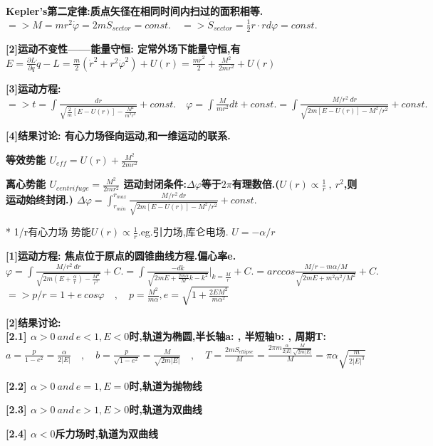 		\bf{Kepler's第二定律}:质点矢径在相同时间内扫过的面积相等.
			$ => M = m r^2 \dot \varphi = 2 m \dot S_{sector} = const.\quad => \dot S_{sector} = \frac{1}{2} r \cdot r d\varphi = const.$
	
		\bf{[2]运动不变性——能量守恒}: 定常外场下能量守恒,有
			$E = \frac{∂ L}{∂ \dot q}\dot q - L = \frac{m}{2} (\dot r^2 + r^2 \dot \varphi^2) + U(r) = \frac{m \dot r^2}{2} + \frac{M^2}{2mr^2} + U(r)$
	
		\bf{[3]运动方程}:
			$ => t = \int \frac{d r}{\sqrt{\frac{2}{m}[E-U(r)] - \frac{M^2}{m^2 r^2}}} + const. \quad \varphi = \int \frac{M}{m r^2} d t  + const.= \int \frac{M/r^2\ dr}{\sqrt{2m [E-U(r)] - M^2/r^2}} + const.$
	
		\bf{[4]结果讨论}: 有心力场径向运动,和一维运动的联系.
	
		\bf{等效势能}
			$U_{eff} = U(r) + \frac{M^2}{2mr^2}$
	
		\bf{离心势能}
			$U_{centrifuge} = \frac{M^2}{2mr^2}$
			运动封闭条件:$\Delta \varphi$等于$2\pi$有理数倍.\quad($U(r) \propto \frac{1}{r}\ ,\ r^2$,则运动始终封闭.)
			$\Delta \varphi = \int_{r_{min}} ^{r_{max}} \frac{M/r^2\ dr}{\sqrt{2m [E-U(r)] - M^2/r^2}} + const.$
	

		* 1/r有心力场
		势能$U(r) \propto \frac{1}{r}$.\quad eg.引力场,库仑电场.
			$U = - \alpha / r$
			
		\bf{[1]运动方程}: 焦点位于原点的圆锥曲线方程.\quad 偏心率e.
			$\varphi = \int \frac{M/r^2\ dr}{\sqrt{2m (E+\frac{\alpha}{r}) - \frac{M^2}{r^2}}} + C. = \int \frac{-dk}{\sqrt{2mE + \frac{2m\alpha}{M}k - k^2}}|_{k = \frac{M}{r}} + C. = arccos\frac{M/r - m\alpha /M}{\sqrt{2mE + m^2 \alpha^2 /M^2}} + C.$
			$ => p/r = 1 + e \ cos \varphi \quad , \quad p = \frac{M^2}{m\alpha} , e = \sqrt{1 + \frac{2 E M^2}{m \alpha^2}}$
			
		\bf{[2]结果讨论}: \\
		
		\bf{[2.1] $\alpha > 0\ and\ e<1, E<0$时,轨道为椭圆}\quad,半长轴a: \quad , 半短轴b: \quad , 周期T:
		$a = \frac{p}{1-e^2} = \frac{\alpha}{2|E|} \quad , \quad b = \frac{p}{\sqrt{1-e^2}} = \frac{M}{\sqrt{2m|E|}} \quad , \quad T = \frac{2mS_{ellipse}}{M} = \frac{2\pi m \frac{\alpha}{2|E|} \frac{M}{\sqrt{2m|E|}}}{M} = \pi \alpha \sqrt{\frac{m}{2|E|^3}} $
		
		\bf{[2.2] $\alpha > 0\ and\ e=1, E=0$时,轨道为抛物线}
		
		\bf{[2.3] $\alpha > 0\ and\ e>1, E>0$时,轨道为双曲线}
		
		\bf{[2.4] $\alpha < 0$斥力场时,轨道为双曲线}



